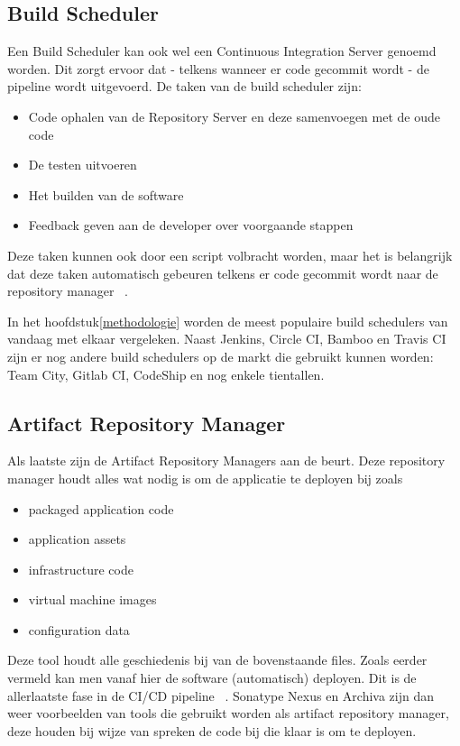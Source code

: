     \subsection{Build Scheduler}
    Een Build Scheduler kan ook wel een Continuous Integration Server genoemd worden.
    Dit zorgt ervoor dat - telkens wanneer er code gecommit wordt - de pipeline wordt uitgevoerd. De taken van de build scheduler zijn: 
    \begin{itemize}
        \item Code ophalen van de Repository Server en deze samenvoegen met de oude code
        \item De testen uitvoeren
        \item Het builden van de software
        \item Feedback geven aan de developer over voorgaande stappen
    \end{itemize}
    Deze taken kunnen ook door een script volbracht worden, maar het is belangrijk dat deze taken automatisch gebeuren telkens er code gecommit wordt naar de repository manager ~\autocite{Riti2018}.

    In het hoofdstuk\ref{methodologie} worden de meest populaire build schedulers van vandaag met elkaar vergeleken. Naast Jenkins, Circle CI, Bamboo en Travis CI zijn er nog andere build schedulers op de markt die gebruikt kunnen worden: Team City, Gitlab CI, CodeShip en nog enkele tientallen.
    
    
    \subsection{Artifact Repository Manager}
    Als laatste zijn de Artifact Repository Managers aan de beurt. Deze repository manager houdt alles wat nodig is om de applicatie te deployen bij zoals
    \begin{itemize}
        \item packaged application code
        \item application assets
        \item infrastructure code
        \item virtual machine images
        \item configuration data
    \end{itemize}
    Deze tool houdt alle geschiedenis bij van de bovenstaande files. Zoals eerder vermeld kan men vanaf hier de software (automatisch) deployen. Dit is de allerlaatste fase in de CI/CD pipeline ~\autocite{Skelton2014}.
    Sonatype Nexus en Archiva zijn dan weer voorbeelden van tools die gebruikt worden als artifact repository manager, deze houden bij wijze van spreken de code bij die klaar is om te deployen. 

